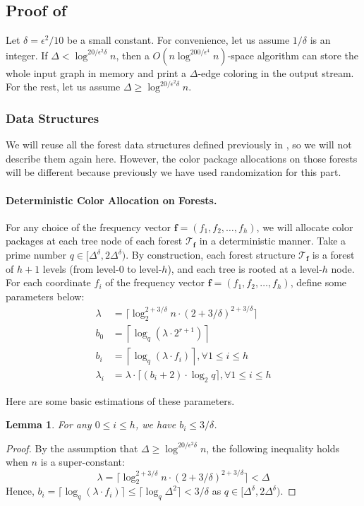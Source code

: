 \documentclass[11pt,a4paper]{article}
\newtheorem{lemma}{Lemma}[section]
\newcommand{\ceil}[1]{\lceil #1 \rceil}
\newcommand{\tree}{\mathcal{T}}
\newcommand{\freq}{\mathbf{f}}
\begin{document}
\subsection{Proof of }
Let $\delta = \epsilon^2/10$ be a small constant. For convenience, let us assume $1/\delta$ is an integer. If $\Delta < \log^{20/\epsilon^2\delta} n$, then a $O(n\log^{200/\epsilon^4}n)$-space algorithm can store the whole input graph in memory and print a $\Delta$-edge coloring in the output stream. For the rest, let us assume $\Delta \geq \log^{20/\epsilon^2\delta}n$.

\subsubsection{Data Structures}
We will reuse all the forest data structures defined previously in , so we will not describe them again here. However, the color package allocations on those forests will be different because previously we have used randomization for this part.

\paragraph*{Deterministic Color Allocation on Forests.} For any choice of the frequency vector $\freq = (f_1, f_2, \ldots, f_h)$, we will allocate color packages at each tree node of each forest $\tree_\freq$ in a deterministic manner. Take a prime number $q\in [\Delta^\delta, 2\Delta^\delta)$. By construction, each forest structure $\tree_\freq$ is a forest of $h+1$ levels (from level-$0$ to level-$h$), and each tree is rooted at a level-$h$ node. For each coordinate $f_i$ of the frequency vector $\freq = (f_1, f_2, \ldots, f_h)$, define some parameters below:
$$\begin{aligned}
	\lambda &= \ceil{\log_2^{2+3/\delta}n\cdot (2 + 3/\delta)^{2+3/\delta}}\\
	b_0 &= \left\lceil\log_q(\lambda\cdot 2^{r+1})\right\rceil\\
	b_i &= \left\lceil\log_q(\lambda\cdot f_i)\right\rceil, \forall 1\leq i\leq h\\
	\lambda_i &= \lambda\cdot \ceil{(b_i+2)\cdot\log_2q}, \forall 1\leq i\leq h
\end{aligned}$$

Here are some basic estimations of these parameters.
\begin{lemma}\label{param-ineq}
    For any $0\leq i\leq h$, we have $b_i\leq 3/\delta$.
\end{lemma}
\begin{proof}
    By the assumption that $\Delta \geq \log^{20/\epsilon^2\delta}n$, the following inequality holds when $n$ is a super-constant:$$\lambda = \ceil{\log_2^{2+3/\delta}n\cdot (2 + 3/\delta)^{2+3/\delta}} < \Delta$$
    Hence, $b_i = \ceil{\log_q(\lambda \cdot f_i)}\leq \ceil{\log_q \Delta^2} < 3/\delta$ as $q\in [\Delta^\delta, 2\Delta^\delta)$.
\end{proof}
\end{document}
